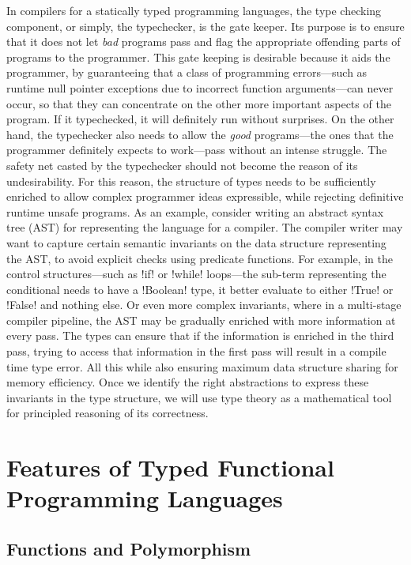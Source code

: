 \documentclass[screen,nonacm]{acmart}
\begin{document}
In compilers for a statically typed programming languages, the type checking component, or
simply, the typechecker, is the gate keeper. Its purpose is to ensure
that it does not let \emph{bad} programs pass and flag the
appropriate offending parts of programs to the programmer.
This gate keeping is desirable because it aids the programmer,
by guaranteeing that a class of programming errors---such as runtime null pointer exceptions
due to incorrect function arguments---can never occur, so that they
can concentrate on the other more important aspects of the program. If
it typechecked, it will definitely run without surprises.
On the other hand, the typechecker also needs to allow the \emph{good}
programs---the ones that the programmer definitely expects to work---pass without an intense struggle.
The safety net casted by the typechecker should not become the reason
of its undesirability. For this reason, the structure of types needs to be
sufficiently enriched to allow complex programmer ideas expressible,
while rejecting definitive runtime unsafe programs.
As an example, consider writing an abstract syntax tree (AST) for representing the
language for a compiler. The compiler writer may want to capture certain semantic
invariants on the data structure representing the AST, to avoid
explicit checks using predicate functions. For example, in the control
structures---such as !if! or !while! loops---the sub-term representing
the conditional needs to have a !Boolean! type, it better evaluate to either !True! or
!False! and nothing else. Or even more complex invariants, where in a multi-stage compiler pipeline,
the AST may be gradually enriched with more information at every pass.
The types can ensure that if the information is enriched in the third pass, trying to
access that information in the first pass will result in a compile time
type error. All this while also ensuring maximum data structure
sharing for memory efficiency\cite{peyton_jones_trees_2017}. Once we
identify the right abstractions to express these invariants in
the type structure, we will use type theory as a mathematical tool
for principled reasoning of its correctness.

\section{Features of Typed Functional Programming Languages}\label{sec:language-features}%
\subsection{Functions and Polymorphism}
\end{document}
